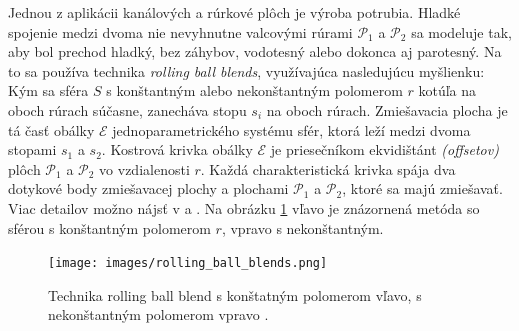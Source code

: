 Jednou z aplikácii kanálových a rúrkové plôch je výroba potrubia. Hladké spojenie medzi dvoma nie nevyhnutne valcovými rúrami $\mathcal{P}_1$ a $\mathcal{P}_2$ sa modeluje tak, aby bol prechod hladký, bez záhybov, vodotesný alebo dokonca aj parotesný. Na to sa používa technika \textit{rolling ball blends}, využívajúca nasledujúcu myšlienku: Kým sa sféra $S$ s konštantným alebo nekonštantným polomerom $r$ kotúľa na oboch rúrach súčasne, zanecháva stopu $s_i$ na oboch rúrach. Zmiešavacia plocha je tá časť obálky $\mathcal{E}$ jednoparametrického systému sfér, ktorá leží medzi dvoma stopami $s_1$ a $s_2$. Kostrová krivka obálky $\mathcal{E}$ je priesečníkom ekvidištánt \textit{(offsetov)} plôch $\mathcal{P}_1$ a $\mathcal{P}_2$ vo vzdialenosti $r$. Každá charakteristická krivka spája dva dotykové body zmiešavacej plochy a plochami $\mathcal{P}_1$ a $\mathcal{P}_2$, ktoré sa majú zmiešavať. Viac detailov možno nájsť v \cite{Kar00} a \cite{Ode20}. Na obrázku \ref{fig:rolling_ball_blends} vľavo je znázornená metóda so sférou s konštantným polomerom $r$, vpravo s nekonštantným.

\begin{figure}[h]
	\centering
	\texttt{[image: images/rolling\_ball\_blends.png]}
	\caption[Technika rolling ball blends.]{Technika rolling ball blend s konštatným polomerom vľavo, s nekonštantným polomerom vpravo \cite{Rollingballblends}.}
	\label{fig:rolling_ball_blends}
\end{figure}